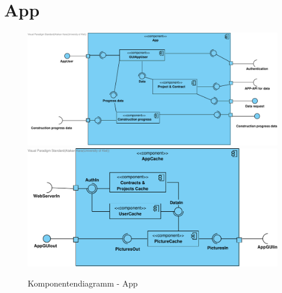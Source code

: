 \clearpage

\section{App}

\begin{figure}[H]
	\centering
	\includegraphics[width=16cm]{img/diagrams/Component-App.pdf}
	\includegraphics[width=16cm]{img/diagrams/cp_appCache.pdf}
	\caption{Komponentendiagramm - App}
	\label{fig:komponentendiagramm-app}
\end{figure}

